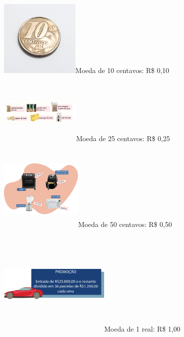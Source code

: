 \begin{multicols}{2}
{%

\includegraphics[width=1.50833in,height=1.45668in]{media/image65.png}Moeda
de 10 centavos: R\$ 0,10

\includegraphics[width=1.52500in,height=1.24749in]{media/image66.png}Moeda
de 25 centavos: R\$ 0,25


\includegraphics[width=1.56667in,height=1.61849in]{media/image67.png}Moeda
de 50 centavos: R\$ 0,50


\includegraphics[width=2.11667in,height=2.01180in]{media/image68.png}Moeda
de 1 real: R\$ 1,00

}
\end{multicols}
